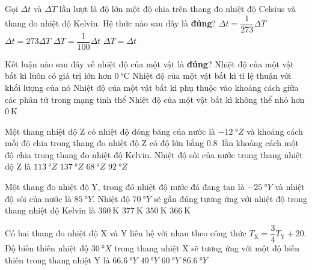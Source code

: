 \begin{ex}
Gọi $\Delta t$ và $\Delta T$ lần lượt  là độ lớn một độ chia trên thang đo nhiệt độ Celsius và thang đo nhiệt độ Kelvin. Hệ thức nào sau đây là \textbf{đúng}?
	\choice
	{$\Delta t=\dfrac{1}{273}\Delta T$}
	{$\Delta t=273\Delta T$}
	{$\Delta T=\dfrac{1}{100}\Delta t$}
	{\True $\Delta T =\Delta t$}
	\loigiai{}
\end{ex}
\begin{ex}
Kết luận nào sau đây về nhiệt độ của một vật là \textbf{đúng}?	
	\choice
	{Nhiệt độ của một vật bất kì luôn có giá trị lớn hơn $\SI{0}{\celsius}$}
	{Nhiệt độ của một vật bất kì tỉ lệ thuận với khối lượng của nó}
	{Nhiệt độ của một vật bất kì phụ thuộc vào khoảng cách giữa các phân tử trong mạng tinh thể}
	{\True Nhiệt độ của một vật bất kì không thể nhỏ hơn $\SI{0}{\kelvin}$}
	\loigiai{}
\end{ex}
\begin{ex}
Một thang nhiệt độ Z có nhiệt độ đóng băng của nước là $-\SI{12}{\degree Z}$ và khoảng cách mỗi độ chia trong thang đo nhiệt độ Z có độ lớn bằng $\SI{0.8}{}$	lần khoảng cách một độ chia trong thang đo nhiệt độ Kelvin. Nhiệt độ sôi của nước trong thang nhiệt độ Z là
	\choice
	{\True $\SI{113}{\degree Z}$}
	{$\SI{137}{\degree Z}$}
	{$\SI{68}{\degree Z}$}
	{$\SI{92}{\degree Z}$}
\end{ex}
\begin{ex}
Một thang đo nhiệt độ Y, trong đó nhiệt độ nước đá đang tan là $-\SI{25}{\degree Y}$ và nhiệt độ sôi của nước là $\SI{85}{\degree Y}$. Nhiệt độ $\SI{70}{\degree Y}$ sẽ gần đúng tương ứng với nhiệt độ trong thang nhiệt độ Kelvin là	
	\choice
	{\True $\SI{360}{\kelvin}$}
	{$\SI{377}{\kelvin}$}
	{$\SI{350}{\kelvin}$}
	{$\SI{366}{\kelvin}$}
\begin{ex}
Có hai thang đo nhiệt độ X và Y liên hệ với nhau theo công thức $T_\text{X}=\dfrac{3}{4}T_\text{Y}+20$. Độ biến thiên nhiệt độ $\SI{30}{\degree X}$ trong thang nhiệt X sẽ tương ứng với một độ biến thiên trong thang nhiệt Y là	
	\choice
	{$\SI{66.6}{\degree Y}$}
	{\True $\SI{40}{\degree Y}$}
	{$\SI{60}{\degree Y}$}
	{$\SI{86.6}{\degree Y}$}
	\loigiai{}
\end{ex}
\end{ex}
